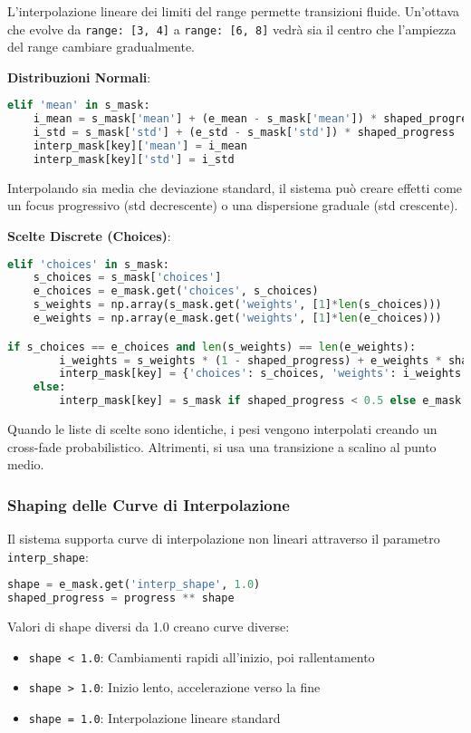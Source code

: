 L'interpolazione lineare dei limiti del range permette transizioni fluide. Un'ottava che evolve da \texttt{range: [3, 4]} a \texttt{range: [6, 8]} vedrà sia il centro che l'ampiezza del range cambiare gradualmente.

\textbf{Distribuzioni Normali}:
\begin{lstlisting}[language=Python]
elif 'mean' in s_mask:
    i_mean = s_mask['mean'] + (e_mean - s_mask['mean']) * shaped_progress
    i_std = s_mask['std'] + (e_std - s_mask['std']) * shaped_progress
    interp_mask[key]['mean'] = i_mean
    interp_mask[key]['std'] = i_std
\end{lstlisting}

Interpolando sia media che deviazione standard, il sistema può creare effetti come un focus progressivo (std decrescente) o una dispersione graduale (std crescente).

\textbf{Scelte Discrete (Choices)}:
\begin{lstlisting}[language=Python]
elif 'choices' in s_mask:
    s_choices = s_mask['choices']
    e_choices = e_mask.get('choices', s_choices)
    s_weights = np.array(s_mask.get('weights', [1]*len(s_choices)))
    e_weights = np.array(e_mask.get('weights', [1]*len(e_choices)))

if s_choices == e_choices and len(s_weights) == len(e_weights):
        i_weights = s_weights * (1 - shaped_progress) + e_weights * shaped_progress
        interp_mask[key] = {'choices': s_choices, 'weights': i_weights.tolist()}
    else:
        interp_mask[key] = s_mask if shaped_progress < 0.5 else e_mask
\end{lstlisting}

Quando le liste di scelte sono identiche, i pesi vengono interpolati creando un cross-fade probabilistico. Altrimenti, si usa una transizione a scalino al punto medio.
\subsubsection{Shaping delle Curve di Interpolazione}
Il sistema supporta curve di interpolazione non lineari attraverso il parametro \texttt{interp\_shape}:

\begin{lstlisting}[language=Python]
shape = e_mask.get('interp_shape', 1.0)
shaped_progress = progress ** shape
\end{lstlisting}

Valori di shape diversi da 1.0 creano curve diverse:
\begin{itemize}
    \item \texttt{shape < 1.0}: Cambiamenti rapidi all'inizio, poi rallentamento
    \item \texttt{shape > 1.0}: Inizio lento, accelerazione verso la fine
    \item \texttt{shape = 1.0}: Interpolazione lineare standard
\end{itemize}

